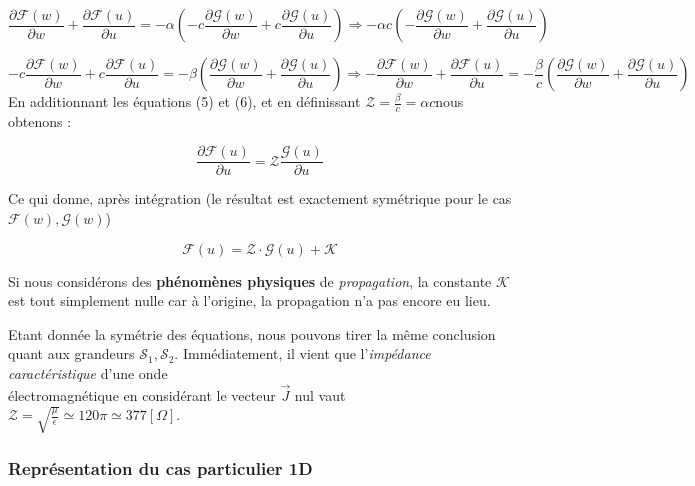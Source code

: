 \documentclass[a4paper,12pt]{article}
\begin{document}
\begin{equation}
  \frac{\partial \mathcal{F}(w)}{\partial w} + \frac{\partial \mathcal{F}(u)}{\partial u}
= -\alpha (-c \frac{\partial \mathcal{G}(w)}{\partial w} + c \frac{\partial \mathcal{G}(u)}{\partial u}) \Rightarrow -\alpha c (-\frac{\partial \mathcal{G}(w)}{\partial w} +\frac{\partial \mathcal{G}(u)}{\partial u}) 
\end{equation}

\begin{equation}
  -c \frac{\partial \mathcal{F}(w)}{\partial w} + c \frac{\partial \mathcal{F}(u)}{\partial u}
= -\beta (\frac{\partial \mathcal{G}(w)}{\partial w} + \frac{\partial \mathcal{G}(u)}{\partial u}) \Rightarrow -\frac{\partial \mathcal{F}(w)}{\partial w} + \frac{\partial \mathcal{F}(u)}{\partial u}
= -\frac{\beta}{c} (\frac{\partial \mathcal{G}(w)}{\partial w} + \frac{\partial \mathcal{G}(u)}{\partial u})
\end{equation}
En additionnant les équations (5) et (6), et en définissant $\mathcal{Z} = \frac{\beta}{c} = \alpha c$nous obtenons : 

\begin{equation}
 \frac{\partial \mathcal{F}(u)}{\partial u} =  \mathcal{Z} \frac{\mathcal{G}(u)}{\partial u}
\end{equation}

Ce qui donne, après intégration (le résultat est exactement symétrique pour le cas $\mathcal{F}(w), \mathcal{G}(w)$) 

\[\mathcal{F}(u) = \mathcal{Z} \cdot \mathcal{G}(u) + \mathcal{K}\]

Si nous considérons des \textbf{phénomènes physiques} de \textit{propagation}, la constante $\mathcal{K}$ est tout simplement nulle car 
à l'origine, la propagation n'a pas encore eu lieu. 

\newpage

Etant donnée la symétrie des équations, nous pouvons tirer la même conclusion quant aux grandeurs $\mathcal{S}_{1},\mathcal{S}_{2}$. 
Immédiatement, il vient que l'\textit{impédance caractéristique} d'une onde\\ électromagnétique en considérant le vecteur $\vec{J}$ nul vaut 
$\mathcal{Z} = \sqrt{\frac{\mu}{\epsilon}} \simeq120 \pi \simeq 377 [\Omega] $. 

\subsubsection{Représentation du cas particulier 1D}
\end{document}
